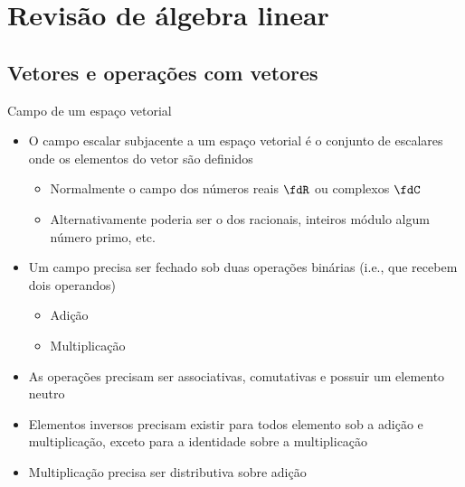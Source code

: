 \section{Revisão de álgebra linear}

\subsection{Vetores e operações com vetores}

\begin{frame}{Campo de um espaço vetorial~\cite{Horn2012}}
  \begin{itemize}
    \item O campo escalar subjacente a um espaço vetorial é o conjunto de escalares onde os elementos do vetor são definidos
    \begin{itemize}
      \item Normalmente o campo dos números reais $ \fdR $ ou complexos $ \fdC $
      \item Alternativamente poderia ser o dos racionais, inteiros módulo algum número primo, etc.
    \end{itemize}
    \item Um campo precisa ser fechado sob duas operações binárias (i.e., que recebem dois operandos)
    \begin{itemize}
      \item Adição
      \item Multiplicação
    \end{itemize}
    \item As operações precisam ser associativas, comutativas e possuir um elemento neutro
    \item Elementos inversos precisam existir para todos elemento sob a adição e multiplicação, exceto para a identidade sobre a multiplicação
    \item Multiplicação precisa ser distributiva sobre adição
  \end{itemize}
\end{frame}


